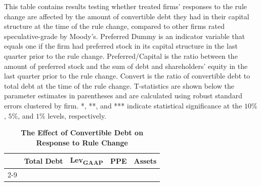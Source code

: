 \documentclass[a4paper, 12pt]{article}
\begin{document}
\begin{landscape}
\pagestyle{empty}

\begin{table}[htbp]
\caption{\textbf{The Effect of Convertible Debt on Response to Rule Change}} \label{table_convert_unmatched}
\begin{singlespace}
\begin{small}

\noindent   This table contains results testing whether treated firms' responses to the rule change are affected by the amount of convertible debt they had in their capital structure at the time of the rule change, compared to other firms rated speculative-grade by Moody's. Preferred Dummy is an indicator variable that equals one if the firm had preferred stock in its capital structure in the last quarter prior to the rule change. Preferred/Capital is the ratio between the amount of preferred stock and the sum of debt and shareholders' equity in the last quarter prior to the rule change. Convert is the ratio of convertible debt to total debt at the time of the rule change. T-statistics are shown below the parameter estimates in parentheses and are calculated using robust standard errors clustered by firm. *, **, and *** indicate statistical significance at the $10\%$, $5\%$, and $1\%$ levels, respectively.
\end{small}
\end{singlespace}
\vspace{3mm}

\small
  \centering
    \begin{tabular}{lcccccccc}
    \toprule
        \textbf{ } &
      \multicolumn{2}{c}{\textbf{Total Debt}} &  \multicolumn{2}{c}{\textbf{Lev\textsubscript{GAAP}}} &
         \multicolumn{2}{c}{\textbf{PPE}} &  \multicolumn{2}{c}{\textbf{Assets}}
      \\
           \cline{2-9}




    \bottomrule
    \end{tabular}
\end{table}
\end{landscape}
\end{document}
